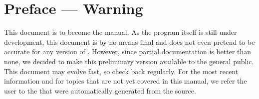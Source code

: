 
\chapter*{Preface --- Warning}
\label{preface}
This document is to become the \pyformex manual. As the \pyformex program itself is still under development, this document is by no means final and does not even pretend to be accurate for any version of \pyformex. 
However, since partial documentation is better than none, we decided to make this preliminary version available to the general public. This document may evolve fast, so check back regularly.
For the most recent information and for topics that are not yet covered in this manual, we refer the user to the  that were automatically generated from the \pyf source.

